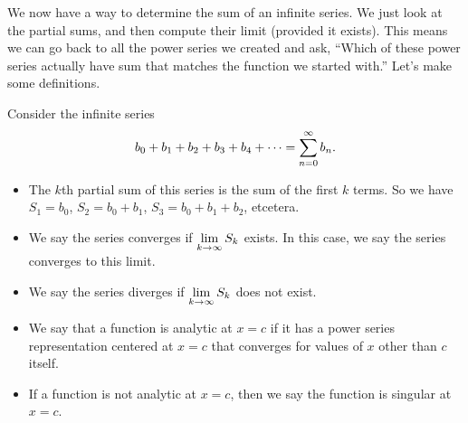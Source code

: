 We now have a way to determine the sum of an infinite series. We just look at the partial sums, and then compute their limit (provided it exists). This means we can go back to all the power series we created and ask, ``Which of these power series actually have sum that matches the function we started with.'' Let's make some definitions.

\begin{definition}
 Consider the infinite series $$b_0+b_1+b_2+b_3+b_4 +\cdots = \displaystyle\sum_{n=0}^\infty b_n.$$  
\begin{itemize}
 \item The $k$th partial sum of this series is the sum of the first $k$ terms.  So we have $S_1=b_0$, $S_2=b_0+b_1$, $S_3=b_0+b_1+b_2$, etcetera.  
 \item We say the series converges if $\displaystyle\lim_{k\to\infty}S_k$ exists. In this case, we say the series converges to this limit.
 \item We say the series diverges if $\displaystyle\lim_{k\to\infty}S_k$ does not exist.
 \item We say that a function is analytic at $x=c$ if it has a power series representation centered at $x=c$ that converges for values of $x$ other than $c$ itself. 
 \item If a function is not analytic at $x=c$, then we say the function is singular at $x=c$.  
\end{itemize}
\end{definition}

